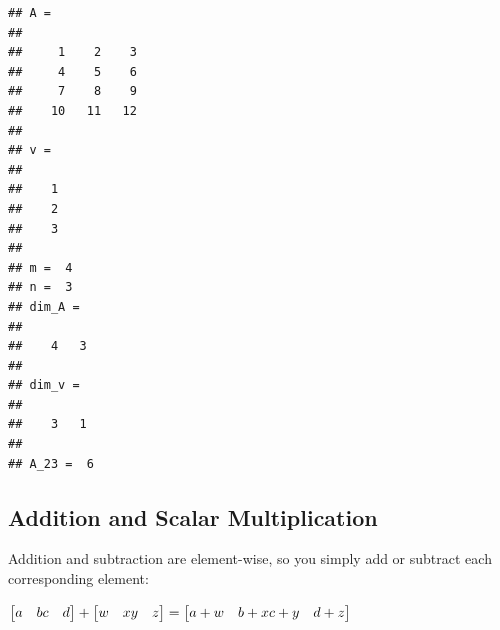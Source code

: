 \documentclass[
]{article}
\newenvironment{Shaded}{\begin{snugshade}}{\end{snugshade}}
\newcommand{\CommentTok}[1]{\textcolor[rgb]{0.56,0.35,0.01}{\textit{#1}}}
\newcommand{\FloatTok}[1]{\textcolor[rgb]{0.00,0.00,0.81}{#1}}
\newcommand{\FunctionTok}[1]{\textcolor[rgb]{0.00,0.00,0.00}{#1}}
\newcommand{\NormalTok}[1]{#1}
\newcommand{\OperatorTok}[1]{\textcolor[rgb]{0.81,0.36,0.00}{\textbf{#1}}}
\begin{document}
\begin{Shaded}
\end{Shaded}

\begin{verbatim}
## A =
## 
##     1    2    3
##     4    5    6
##     7    8    9
##    10   11   12
## 
## v =
## 
##    1
##    2
##    3
## 
## m =  4
## n =  3
## dim_A =
## 
##    4   3
## 
## dim_v =
## 
##    3   1
## 
## A_23 =  6
\end{verbatim}

\hypertarget{addition-and-scalar-multiplication}{%
\subsection{Addition and Scalar
Multiplication}\label{addition-and-scalar-multiplication}}

Addition and subtraction are element-wise, so you simply add or subtract
each corresponding element:

\(\begin{bmatrix} a & b \newline c & d \newline \end{bmatrix} +\begin{bmatrix} w & x \newline y & z \newline \end{bmatrix} =\begin{bmatrix} a+w & b+x \newline c+y & d+z \newline \end{bmatrix}\)
\end{document}
